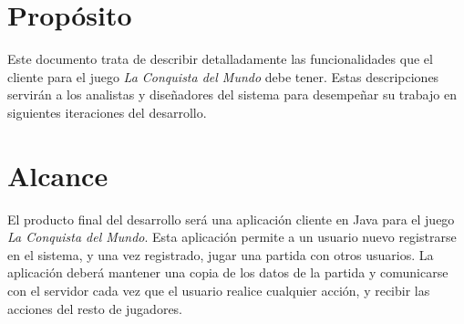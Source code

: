 \section{Propósito}

Este documento trata de describir detalladamente las funcionalidades que el
cliente para el juego \textit{La Conquista del Mundo} debe tener. Estas
descripciones servirán a los analistas y diseñadores del sistema para
desempeñar su trabajo en siguientes iteraciones del desarrollo.

\section{Alcance}

El producto final del desarrollo será una aplicación cliente en Java para el
juego \textit{La Conquista del Mundo}. Esta aplicación permite a un usuario
nuevo registrarse en el sistema, y una vez registrado, jugar una partida con
otros usuarios. La aplicación deberá mantener una copia de los datos de la
partida y comunicarse con el servidor cada vez que el usuario realice cualquier
acción, y recibir las acciones del resto de jugadores.

